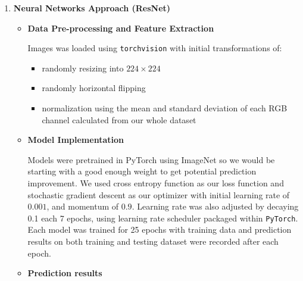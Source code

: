 \documentclass[11.5pt]{article}
\begin{document}
\begin{enumerate}
\begin{itemize}
        \end{itemize}
        \item \textbf{Neural Networks Approach (ResNet)}
        \begin{itemize}
            \item \textbf{Data Pre-processing and Feature Extraction}

            Images was loaded using \texttt{torchvision} with initial transformations of:
            \begin{itemize}
                \item randomly resizing into $224 \times 224$
                \item randomly horizontal flipping
                \item normalization using the mean and standard deviation of each RGB channel calculated from our whole dataset
            \end{itemize}

            \item \textbf{Model Implementation}

            Models were pretrained in PyTorch using ImageNet so we would be starting with a good enough weight to get potential prediction improvement.
            We used cross entropy function as our loss function and stochastic gradient descent as our optimizer with initial learning rate of $0.001$, and momentum of $0.9$.
            Learning rate was also adjusted by decaying 0.1 each 7 epochs, using learning rate scheduler packaged within \texttt{PyTorch}.
            Each model was trained for 25 epochs with training data and prediction results on both training and testing dataset were recorded after each epoch.
            \item \textbf{Prediction results}


\end{itemize}
\end{enumerate}
\end{document}
